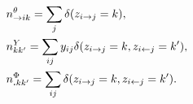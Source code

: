 
\begin{align*}                                                                                                                                        
&n^{\theta}_{\rightarrow ik} = \sum_j \delta(z_{i\rightarrow j}=k), \\
&n^{{Y}}_{kk'} = \sum_{ij} y_{ij}\delta(z_{i\rightarrow j}=k, z_{i\leftarrow j}=k'), \\
&n^{\Phi}_{\bm{.}kk'} = \sum_{ij} \delta( z_{i\rightarrow j}=k, z_{i\leftarrow j}=k').
\end{align*}   

